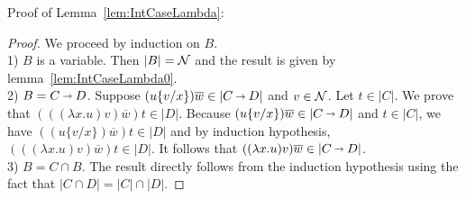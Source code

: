 \documentclass{llncs} %
\newif\ifnonotes\nonotesfalse
\newcommand{\Comment}[1]{\ifnonotes\else{\color{red}    \noindent{\bf Comment: }#1}\fi}
\begin{document}
Proof of Lemma~\ref{lem:IntCaseLambda}:

\begin{proof}
 We proceed by induction on $B$.
\\
1) $B$ is a variable. Then $|B| = \mathcal{N}$ and the result is given by lemma~\ref{lem:IntCaseLambda0}.
\\
2) $B= C\vlim D$.
Suppose $(u\{v/x\})\overline{w} \in |C\vlim D|$ and $v\in\mathcal{N}$. Let $t\in|C|$. We prove that  $(((\lambda x.u) v)\overline{w})t \in |D|$. Because $(u\{v/x\})\overline{w} \in |C\vlim D|$ and $t\in|C|$, we have $((u\{v/x\})\overline{w})t \in |D|$ and by induction hypothesis, $(((\lambda x.u) v)\overline{w})t \in |D|$. It follows that $((\lambda x.u) v)\overline{w} \in |C\vlim D|$.
\\
3) $B= C\cap B$.
The result directly follows from the induction hypothesis using the fact that $|C\cap D| = |C|\cap|D|$.

\end{proof}
% 
% 
% 
% 
% 
% 
% 
% 
% 
% 
\end{document}
